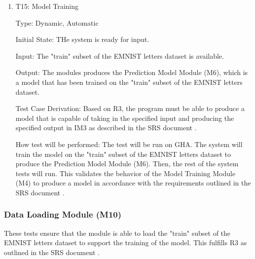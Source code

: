 \documentclass[12pt, titlepage]{article}
\begin{document}
\begin{enumerate}

\item{T15: Model Training\\}

Type: Dynamic, Automatic
					
Initial State: THe \progname{} system is ready for input.
					
Input: The "train" subset of the EMNIST letters dataset is available.
					
Output: The modules produces the Prediction Model Module (M6), which is a model
that has been trained on the "train" subset of the EMNIST letters dataset. 

Test Case Derivation: Based on R3, the program must be able to produce a model
that is capable of taking in the specified input and producing the specified
output in IM3 as described in the SRS document \citep{SRS}.

How test will be performed: The test will be run on GHA. The system will train
the model on the "train" subset of the EMNIST letters dataset to produce the
Prediction Model Module (M6). Then, the rest of the system tests will run. This
validates the behavior of the Model Training Module (M4) to produce a model
in accordance with the requirements outlined in the SRS document \citep{SRS}.

\end{enumerate}

\subsubsection{Data Loading Module (M10)}

These tests ensure that the module is able to load the "train" subset of the
EMNIST letters dataset to support the training of the model. This fulfills R3 as
outlined in the SRS document \citep{SRS}.
\end{document}
